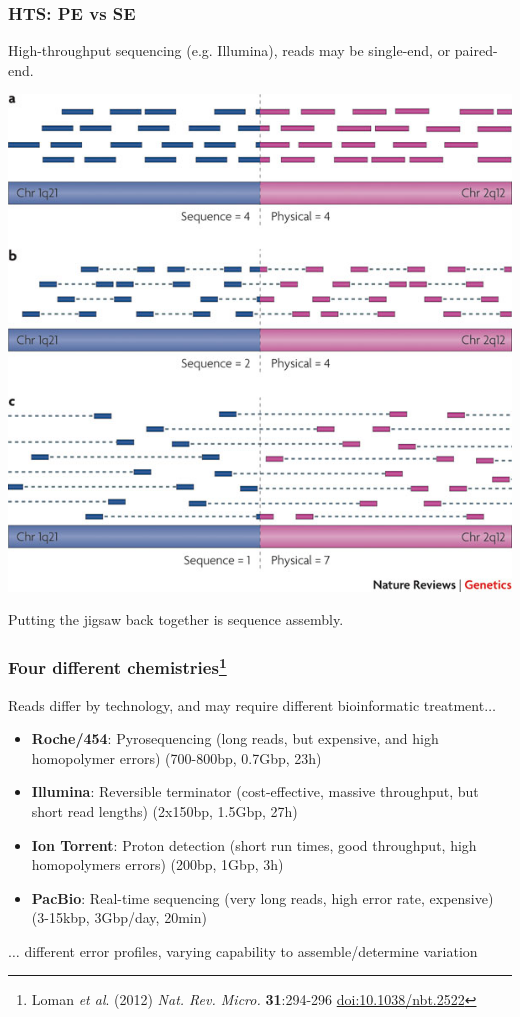 \begin{frame}
  \frametitle{HTS: PE vs SE}
  High-throughput sequencing (e.g. Illumina), reads may be single-end, or paired-end.
  \begin{center}
    \includegraphics[height=0.55\textheight]{images/pe_vs_se}
  \end{center}      
  Putting the jigsaw back together is sequence assembly.
\end{frame}

\begin{frame}
  \frametitle{Four different chemistries\footnote{\tiny{Loman \textit{et al}. (2012) \textit{Nat. Rev. Micro.} \textbf{31}:294-296 \href{http://dx.doi.org/10.1038/nbt.2522}{doi:10.1038/nbt.2522}}}}
  Reads differ by technology, and may require different bioinformatic treatment$\ldots$
  \begin{itemize}
    \item \textbf{Roche/454}: Pyrosequencing (long reads, but expensive, and high homopolymer errors) (700-800bp, 0.7Gbp, 23h)
    \item \textbf{Illumina}: Reversible terminator (cost-effective, massive throughput, but short read lengths) (2x150bp, 1.5Gbp, 27h)
    \item \textbf{Ion Torrent}: Proton detection (short run times, good throughput, high homopolymers errors) (200bp, 1Gbp, 3h)
    \item \textbf{PacBio}: Real-time sequencing (very long reads, high error rate, expensive) (3-15kbp, 3Gbp/day, 20min)
  \end{itemize}
  $\ldots$ different error profiles, varying capability to assemble/determine variation
\end{frame}

